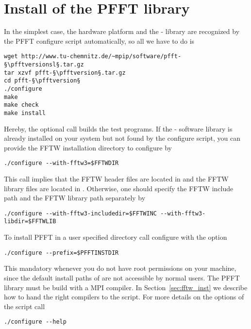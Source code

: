 \section{Install of the PFFT library}
In the simplest case, the hardware platform and the \fftw-\fftwversion{} library are
recognized by the PFFT configure script automatically, so all we have to do is
\begin{lstlisting}[escapechar=§]
wget http://www.tu-chemnitz.de/~mpip/software/pfft-§\pfftversionsl§.tar.gz
tar xzvf pfft-§\pfftversion§.tar.gz
cd pfft-§\pfftversion§
./configure
make
make check
make install
\end{lstlisting}
Hereby, the optional call  builds the test programs.
If the \fftw-\fftwversion{} software library is already installed on your system but not found by the configure script,
you can provide the FFTW installation directory  to configure by
\begin{lstlisting}
./configure --with-fftw3=$FFTWDIR
\end{lstlisting}
This call implies that the FFTW header files are located in  and the FFTW library files are located
in . Otherwise, one should specify the FFTW include path  and the FFTW library path
 separately by
\begin{lstlisting}
./configure --with-fftw3-includedir=$FFTWINC --with-fftw3-libdir=$FFTWLIB
\end{lstlisting}
To install PFFT in a user specified directory  call configure with the option
\begin{lstlisting}
./configure --prefix=$PFFTINSTDIR
\end{lstlisting}
This mandatory whenever you do not have root permissions on your machine, since the default install paths of 
 are not accessible by normal users.
The PFFT library must be build with a MPI compiler. In Section~\ref{sec:fftw_inst} we describe how to hand the right compilers to the  script.
For more details on the options of the  script call
\begin{lstlisting}
./configure --help
\end{lstlisting}
